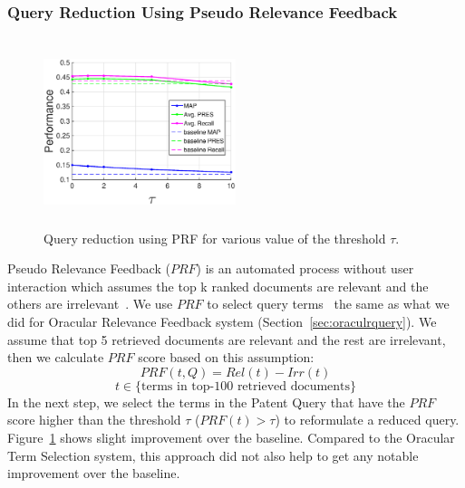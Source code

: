 \subsubsection{Query Reduction Using Pseudo Relevance Feedback}
\begin{figure}[t!]
   \centering
   \includegraphics[width=0.50\textwidth,height=55mm]{figs/prf.eps}
   \caption{Query reduction using PRF for various value of the threshold $\tau$.}   
   \label{fig:prf} 
\end{figure}
Pseudo Relevance Feedback ($\mathit{PRF}$) is an automated process without user interaction which assumes the top k ranked documents are relevant and the others are irrelevant~\citep{Baeza-Yates2011}. We use $\mathit{PRF}$ to select query terms~\cite{maxwell2013compact} the same as what we did for Oracular Relevance Feedback system (Section~\ref{sec:oraculrquery}). We assume that top 5 retrieved documents are relevant and the rest are irrelevant, then we calculate $\mathit{PRF}$ score based on this assumption:  
\begin{equation}
PRF(t,Q)=Rel(t)-Irr(t) 
 \label{eq:score}
\end{equation}
\vspace*{-2ex}
\begin{displaymath}t\in \lbrace \mbox{terms in top-100 retrieved documents}\rbrace\end{displaymath}
In the next step, we select the terms in the Patent Query that have the  $\mathit{PRF}$ score higher than the threshold $\tau$ ($PRF(t)>\tau$) to reformulate a reduced query. Figure~\ref{fig:prf} shows slight improvement over the baseline. Compared to the Oracular Term Selection system, this approach did not also help to get any notable improvement over the baseline.

